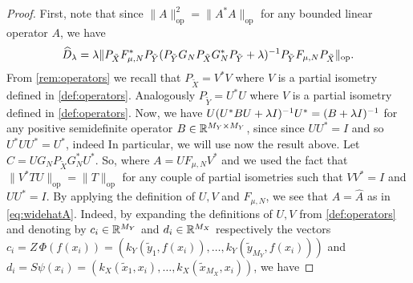 \begin{proof}
First, note that since $\|A\|_{\mathrm{op}}^2 = \|A^*A\|_{\mathrm{op}}$ for any bounded linear operator $A$, we have
$$
\widehat{D}_\lambda = \lambda \|P_{\tilde{X}} F_{\mu, N}^* P_{\tilde{Y}} (P_{\tilde{Y}} G_N P_{\tilde{X}} G_N^*P_{\tilde{Y}} + \lambda)^{-1} P_{\tilde{Y}} F_{\mu, N} P_{\tilde{X}} \|_{\mathrm{op}}.
$$
From \cref{rem:operators} we recall that $P_{\tilde X} = V^*V$ where $V$ is a partial isometry defined in \cref{def:operators}. Analogously $P_{\tilde Y} = U^*U$ where $V$ is a partial isometry defined in \cref{def:operators}.
Now, we have $U(U^*BU + \lambda I)^{-1}U^* = (B + \lambda I)^{-1}$ for any positive semidefinite operator $B \in \mathbb R^{M_Y \times M_Y}$, since since $UU^*=I$ and so $U^*UU^* = U^*$, indeed
In particular, we will use now the result above. Let $C = U G_N P_{\tilde{X}} G_N^* U^*$. So,
where $A = U F_{\mu, N} V^*$ and we used the fact that $\|V^* T U\|_{\mathrm{op}} = \|T\|_{\mathrm{op}}$ for any couple of partial isometries such that $VV^* = I$ and $UU^* = I$.
By applying the definition of $U, V$ and $F_{\mu, N}$, we see that $A = \widehat{A}$ as in \cref{eq:widehatA}.
Indeed, by expanding the definitions of $U, V$ from \cref{def:operators} and denoting by $c_i \in \mathbb R^{M_Y}$ and $d_i \in \mathbb R^{M_X}$ respectively the vectors
$c_i = Z\,\Phi(f(x_i)) = \left(k_Y(\tilde{y}_1,f(x_i)), \dots,  k_Y(\tilde{y}_{M_Y},f(x_i)) \right)$ and
$d_i = S\psi(x_i) = \left(k_X(\tilde{x}_1,x_i), \dots,  k_X(\tilde{x}_{M_X},x_i) \right)$, we have
\end{proof}
